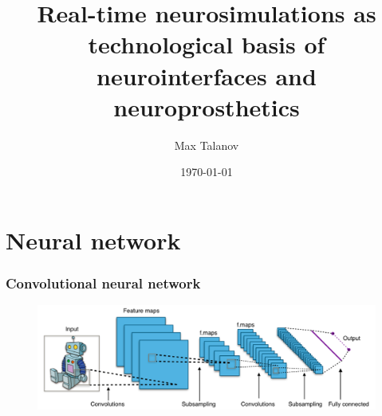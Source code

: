 \documentclass[12pt, aspectratio=169]{beamer}
\title[Real-time neurosimulations as technological basis of neurointerfaces and neuroprosthetics]{Real-time neurosimulations as technological basis of neurointerfaces and neuroprosthetics} %
\author[Max Talanov]{
  Max Talanov
}
\institute[NcN laboratory: ITIS : KFU]%
{
Neuromorphic computing and Neurosimulations laboratory, ITIS, KFU \\ %
\medskip
\textit{max.talanov@gmail.com} %
}
\date{\today} %
\begin{document}
\begin{frame}
\titlepage %
\end{frame}



\section{Neural network}
\begin{frame}
  \frametitle{Convolutional neural network}
  \begin{figure}
    \includegraphics[width=0.9\linewidth]{Typical_cnn}
  \end{figure}
\end{frame}

\end{document}
